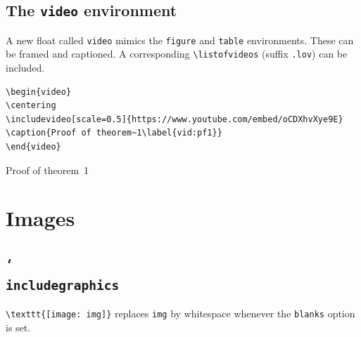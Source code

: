 \documentclass{article}
\theoremstyle{break}
\newcommand{\vbs}{\char`\\}
\begin{document}
\subsection{The {\tt video} environment}

A new float called {\tt video} mimics the {\tt figure} and {\tt table} environments. These can be framed and captioned. A corresponding \verb+\listofvideos+ (suffix {\tt .lov}) can be included.

\begin{Verbatim}[frame=single]
\begin{video}
\centering
\includevideo[scale=0.5]{https://www.youtube.com/embed/oCDXhvXye9E}
\caption{Proof of theorem~1\label{vid:pf1}}
\end{video}
\end{Verbatim}

\begin{video}
\centering
{}
\caption{Proof of theorem~1\label{vid:pf1}}
\end{video}

%


\section{Images}

\subsection{\tt\vbs includegraphics}
\verb+\texttt{[image: img]}+ replaces \verb+img+ by whitespace whenever the {\tt blanks} option is set.
\end{document}
